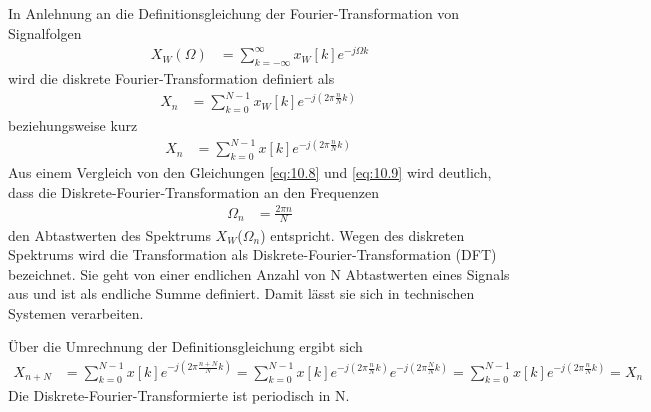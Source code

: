 In Anlehnung an die Definitionsgleichung der Fourier-Transformation von Signalfolgen
\begin{align}
X_{W}(\Omega) &= \sum\limits_{k = - \infty}^{\infty}{x_{W}[ k]  e^{- j  \Omega  k}} \label{eq:10.8}
\end{align}
wird die diskrete Fourier-Transformation definiert als
\begin{align}
X_{n} &= \sum\limits_{k = 0}^{N - 1}{x_{W}[ k]  e^{- j  \left( 2  \pi  \frac{n}{N}  k \right)}}\ \label{eq:10.9}
\end{align}
beziehungsweise kurz
\begin{align}
X_{n} &= \sum\limits_{k = 0}^{N - 1}{x[ k]  e^{- j  \left( 2  \pi  \frac{n}{N}  k \right)}}\ \label{eq:10.10}
\end{align}
Aus einem Vergleich von den Gleichungen \eqref{eq:10.8} und \eqref{eq:10.9} wird deutlich, dass die Diskrete-Fourier-Transformation an den Frequenzen
\begin{align}
\Omega_{n} &= \frac{2  \pi  n}{N} \label{eq:10.11}
\end{align}
den Abtastwerten des Spektrums \(X_{W}\)(\(Ω_{n}\)) entspricht. Wegen des diskreten Spektrums wird die Transformation als Diskrete-Fourier-Transformation (DFT) bezeichnet. Sie geht von einer endlichen Anzahl von N Abtastwerten eines Signals aus und ist als endliche Summe definiert. Damit lässt sie sich in technischen Systemen verarbeiten.

Über die Umrechnung der Definitionsgleichung ergibt sich
\begin{align}
X_{n + N} &= \sum\limits_{k = 0}^{N - 1}{x[ k]  e^{- j  \left( 2  \pi  \frac{n + N}{N}  k \right)}} = \sum\limits_{k = 0}^{N - 1}{x[ k]  e^{- j  \left( 2  \pi  \frac{n}{N}  k \right)}  e^{- j  \left( 2  \pi  \frac{N}{N}  k \right)}} = \sum\limits_{k = 0}^{N - 1}{x[ k]  e^{- j  \left( 2  \pi  \frac{n}{N}  k \right)}} = X_{n}\ \label{eq:10.12}
\end{align}
Die Diskrete-Fourier-Transformierte ist periodisch in N.

